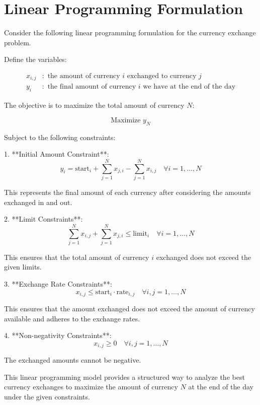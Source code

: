 \documentclass{article}
\begin{document}
\section*{Linear Programming Formulation}

Consider the following linear programming formulation for the currency exchange problem. 

Define the variables:

\begin{align*}
x_{i,j} & : \text{ the amount of currency } i \text{ exchanged to currency } j \\
y_i & : \text{ the final amount of currency } i \text{ we have at the end of the day}
\end{align*}

The objective is to maximize the total amount of currency \( N \):

\[
\text{Maximize } y_N
\]

Subject to the following constraints:

1. **Initial Amount Constraint**:
   \[
   y_i = \text{start}_i + \sum_{j=1}^{N} x_{j,i} - \sum_{j=1}^{N} x_{i,j} \quad \forall i = 1, \ldots, N
   \]

   This represents the final amount of each currency after considering the amounts exchanged in and out.

2. **Limit Constraints**:
   \[
   \sum_{j=1}^{N} x_{i,j} + \sum_{j=1}^{N} x_{j,i} \leq \text{limit}_i \quad \forall i = 1, \ldots, N
   \]

   This ensures that the total amount of currency \( i \) exchanged does not exceed the given limits.

3. **Exchange Rate Constraints**:
   \[
   x_{i,j} \leq \text{start}_i \cdot \text{rate}_{i,j} \quad \forall i, j = 1, \ldots, N
   \]

   This ensures that the amount exchanged does not exceed the amount of currency available and adheres to the exchange rates.

4. **Non-negativity Constraints**:
   \[
   x_{i,j} \geq 0 \quad \forall i, j = 1, \ldots, N
   \]

   The exchanged amounts cannot be negative.

This linear programming model provides a structured way to analyze the best currency exchanges to maximize the amount of currency \( N \) at the end of the day under the given constraints.
\end{document}
